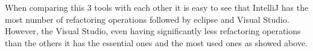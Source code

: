 When comparing this 3 tools with each other it is easy to see that IntelliJ has the most number of refactoring operations followed by eclipse and Visual Studio. However, the Visual Studio, even having significantly less refactoring operations than the others it has the essential ones and the most used ones as showed above.



